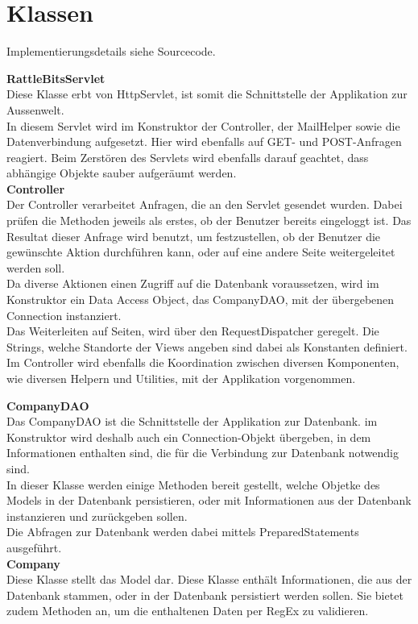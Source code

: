 \documentclass[12pt]{scrartcl}
\begin{document}
\section{Klassen}
Implementierungsdetails siehe Sourcecode.

\textbf{RattleBitsServlet}\\
Diese Klasse erbt von HttpServlet, ist somit die Schnittstelle der Applikation zur Aussenwelt.\\
In diesem Servlet wird im Konstruktor der Controller, der MailHelper sowie die Datenverbindung aufgesetzt. Hier wird ebenfalls auf GET- und POST-Anfragen reagiert. Beim Zerstören des Servlets wird ebenfalls darauf geachtet, dass abhängige Objekte sauber aufgeräumt werden.\\

\textbf{Controller}\\
Der Controller verarbeitet Anfragen, die an den Servlet gesendet wurden. Dabei prüfen die Methoden jeweils als erstes, ob der Benutzer bereits eingeloggt ist. Das Resultat dieser Anfrage wird benutzt, um festzustellen, ob der Benutzer die gewünschte Aktion durchführen kann, oder auf eine andere Seite weitergeleitet werden soll.\\
Da diverse Aktionen einen Zugriff auf die Datenbank voraussetzen, wird im Konstruktor ein Data Access Object, das CompanyDAO, mit der übergebenen Connection instanziert.\\
Das Weiterleiten auf Seiten, wird über den RequestDispatcher geregelt. Die Strings, welche Standorte der Views angeben sind dabei als Konstanten definiert.\\
Im Controller wird ebenfalls die Koordination zwischen diversen Komponenten, wie diversen Helpern und Utilities, mit der Applikation vorgenommen.

\textbf{CompanyDAO}\\
Das CompanyDAO ist die Schnittstelle der Applikation zur Datenbank. im Konstruktor wird deshalb auch ein Connection-Objekt übergeben, in dem Informationen enthalten sind, die für die Verbindung zur Datenbank notwendig sind.\\
In dieser Klasse werden einige Methoden bereit gestellt, welche Objetke des Models in der Datenbank persistieren, oder mit Informationen aus der Datenbank instanzieren und zurückgeben sollen.\\
Die Abfragen zur Datenbank werden dabei mittels PreparedStatements ausgeführt.\\

\textbf{Company}\\
Diese Klasse stellt das Model dar. Diese Klasse enthält Informationen, die aus der Datenbank stammen, oder in der Datenbank persistiert werden sollen. Sie bietet zudem Methoden an, um die enthaltenen Daten per RegEx zu validieren.\\
\end{document}
